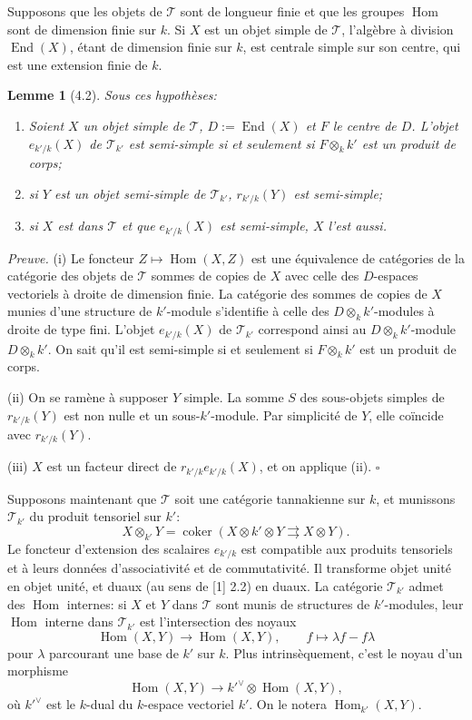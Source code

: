 \documentclass[10pt]{article}
\newcommand{\End}{\operatorname{End}}
\newcommand{\Hom}{\operatorname{Hom}}
\newcommand{\T}{\mathcal T}
\theoremstyle{deligne}
\newtheorem*{lemma*}{Lemme}
\newenvironment{proofdel}{\textit{Preuve.}}{\hfill$\square$}
\newcommand{\heading}[1]{\vspace{0.7em}\noindent{\bfseries #1}\quad}
\begin{document}
Supposons que les objets de \(\T\) sont de longueur finie et que les groupes \(\Hom\) sont de dimension finie sur \(k\). Si \(X\) est un objet simple de \(\T\), l'algèbre à division \(\End(X)\), étant de dimension finie sur \(k\), est centrale simple sur son centre, qui est une extension finie de \(k\).

\begin{lemma*}[4.2]
Sous ces hypothèses:
\begin{enumerate}[label=(\roman*)]
\item Soient \(X\) un objet simple de \(\T\), \(D:=\End(X)\) et \(F\) le centre de \(D\). L'objet \(e_{k'/k}(X)\) de \(\T_{k'}\) est semi-simple si et seulement si \(F\otimes_k k'\) est un produit de corps;
\item si \(Y\) est un objet semi-simple de \(\T_{k'}\), \(r_{k'/k}(Y)\) est semi-simple;
\item si \(X\) est dans \(\T\) et que \(e_{k'/k}(X)\) est semi-simple, \(X\) l'est aussi.
\end{enumerate}
\end{lemma*}

\begin{proofdel}
(i) Le foncteur \(Z\mapsto \Hom(X,Z)\) est une équivalence de catégories de la catégorie des objets de \(\T\) sommes de copies de \(X\) avec celle des \(D\)-espaces vectoriels à droite de dimension finie. La catégorie des sommes de copies de \(X\) munies d'une structure de \(k'\)-module s'identifie à celle des \(D\otimes_k k'\)-modules à droite de type fini. L'objet \(e_{k'/k}(X)\) de \(\T_{k'}\) correspond ainsi au \(D\otimes_k k'\)-module \(D\otimes_k k'\). On sait qu'il est semi-simple si et seulement si \(F\otimes_k k'\) est un produit de corps.

(ii) On se ramène à supposer \(Y\) simple. La somme \(S\) des sous-objets simples de \(r_{k'/k}(Y)\) est non nulle et un sous-\(k'\)-module. Par simplicité de \(Y\), elle coïncide avec \(r_{k'/k}(Y)\).

(iii) \(X\) est un facteur direct de \(r_{k'/k}e_{k'/k}(X)\), et on applique (ii).
\end{proofdel}

\heading{4.3.}
Supposons maintenant que \(\T\) soit une catégorie tannakienne sur \(k\), et munissons \(\T_{k'}\) du produit tensoriel sur \(k'\):
\[
X\otimes_{k'}Y=\operatorname{coker}(X\otimes k'\otimes Y\rightrightarrows X\otimes Y).
\]
Le foncteur d'extension des scalaires \(e_{k'/k}\) est compatible aux produits tensoriels et à leurs données d'associativité et de commutativité. Il transforme objet unité en objet unité, et duaux (au sens de [1] 2.2) en duaux. La catégorie \(\T_{k'}\) admet des \(\Hom\) internes: si \(X\) et \(Y\) dans \(\T\) sont munis de structures de \(k'\)-modules, leur \(\Hom\) interne dans \(\T_{k'}\) est l'intersection des noyaux
\[
\Hom(X,Y)\longrightarrow \Hom(X,Y),\qquad
f\longmapsto \lambda f-f\lambda
\]
pour \(\lambda\) parcourant une base de \(k'\) sur \(k\). Plus intrinsèquement, c'est le noyau d'un morphisme
\[
\Hom(X,Y)\longrightarrow k'^{\vee}\otimes \Hom(X,Y),
\]
où \(k'^{\vee}\) est le \(k\)-dual du \(k\)-espace vectoriel \(k'\). On le notera \(\Hom_{k'}(X,Y)\).
\end{document}
